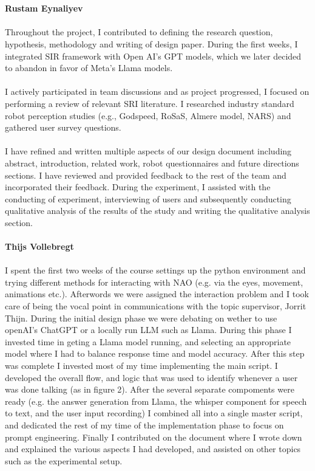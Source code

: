 \documentclass[runningheads]{llncs}
\begin{document}
\\\\
\textbf{Rustam Eynaliyev}
\\\\
Throughout the project, I contributed to defining the research question, hypothesis, methodology and writing of design paper. During the first weeks, I integrated SIR framework with Open AI's GPT models, which we later decided to abandon in favor of Meta's Llama models.
\\\\
I actively participated in team discussions and as project progressed, I focused on performing a review of relevant SRI literature. I researched industry standard robot perception studies (e.g., Godspeed, RoSaS, Almere model, NARS) and gathered user survey questions. 
\\\\
I have refined and written multiple aspects of our design document including abstract, introduction, related work, robot questionnaires and future directions sections. I have reviewed and provided feedback to the rest of the team and incorporated their feedback. During the experiment, I assisted with the conducting of experiment, interviewing of users and subsequently conducting qualitative analysis of the results of the study and writing the qualitative analysis section.
\\\\
\textbf{Thijs Vollebregt}
\\\\
I spent the first two weeks of the course settings up the python environment and trying different methods for interacting with NAO (e.g. via the eyes, movement, animations etc.). Afterwords we were assigned the interaction problem and I took care of being the vocal point in communications with the topic supervisor, Jorrit Thijn. During the initial design phase we were debating on wether to use openAI's ChatGPT or a locally run LLM such as Llama. During this phase I invested time in geting a Llama model running, and selecting an appropriate model where I had to balance response time and model accuracy. After this step was complete I invested most of my time implementing the main script. I developed the overall flow, and logic that was used to identify whenever a user was done talking (as in figure 2). After the several separate compoments were ready (e.g. the answer generation from Llama, the whisper component for speech to text, and the user input recording) I combined all into a single master script, and dedicated the rest of my time of the implementation phase to focus on prompt engineering. Finally I contributed on the document where I wrote down and explained the various aspects I had developed, and assisted on other topics such as the experimental setup.
\end{document}
